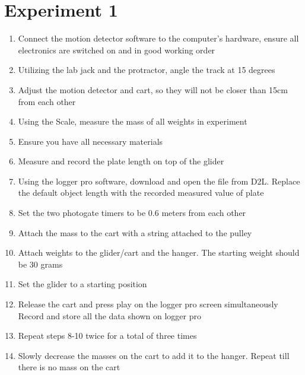 

{}

\section{{Experiment 1}}

{}

\begin{enumerate}
	\item {Connect the motion detector software to the computer’s hardware, ensure all electronics are switched on and in good working order}
	\item {Utilizing the lab jack and the protractor, angle the track at 15 degrees}
	\item {Adjust the motion detector and cart, so they will not be closer than 15cm from each other}
	\item {Using the Scale, measure the mass of all weights in experiment}
	\item {Ensure you have all necessary materials}
	\item {Measure and record the plate length on top of the glider}
	\item {Using the logger pro software, download and open the file from D2L. Replace the default object length with the recorded measured value of plate}
	\item {Set the two photogate timers to be 0.6 meters from each other}
	\item {Attach the mass to the cart with a string attached to the pulley}
	\item {Attach weights to the glider/cart and the hanger. The starting weight should be 30 grams}
	\item {Set the glider to a starting position}
	\item {Release the cart and press play on the logger pro screen simultaneously}
	{Record and store all the data shown on logger pro}
	\item {Repeat steps 8-10 twice for a total of three times}
	\item {Slowly decrease the masses on the cart to add it to the hanger. Repeat till there is no mass on the cart}
\end{enumerate}



